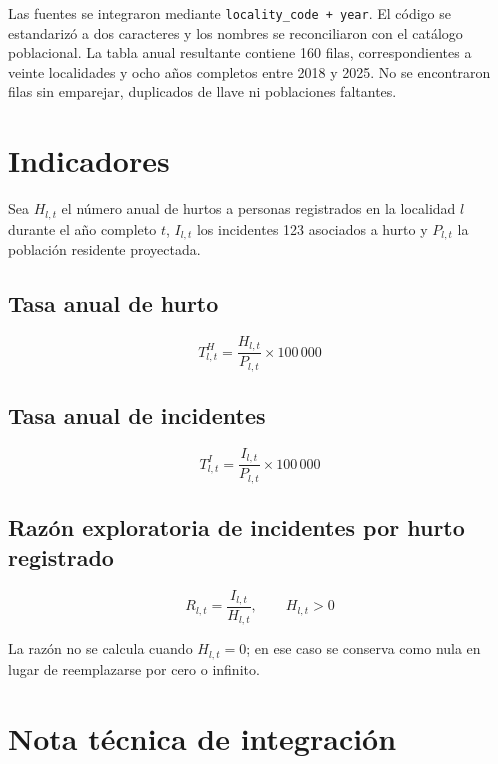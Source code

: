 \documentclass[11pt,letterpaper,oneside]{report}
\begin{document}
Las fuentes se integraron mediante \texttt{locality\_code + year}. El código se estandarizó a dos caracteres y los nombres se reconciliaron con el catálogo poblacional. La tabla anual resultante contiene 160 filas, correspondientes a veinte localidades y ocho años completos entre 2018 y 2025. No se encontraron filas sin emparejar, duplicados de llave ni poblaciones faltantes.

\section{Indicadores}

Sea $H_{l,t}$ el número anual de hurtos a personas registrados en la localidad $l$ durante el año completo $t$, $I_{l,t}$ los incidentes 123 asociados a hurto y $P_{l,t}$ la población residente proyectada.

\subsection{Tasa anual de hurto}

\begin{equation}
T^{H}_{l,t}=\frac{H_{l,t}}{P_{l,t}}\times 100\,000
\end{equation}

\subsection{Tasa anual de incidentes}

\begin{equation}
T^{I}_{l,t}=\frac{I_{l,t}}{P_{l,t}}\times 100\,000
\end{equation}

\subsection{Razón exploratoria de incidentes por hurto registrado}

\begin{equation}
R_{l,t}=\frac{I_{l,t}}{H_{l,t}}, \qquad H_{l,t}>0
\end{equation}

La razón no se calcula cuando $H_{l,t}=0$; en ese caso se conserva como nula en lugar de reemplazarse por cero o infinito.

\section{Nota técnica de integración}
\end{document}
